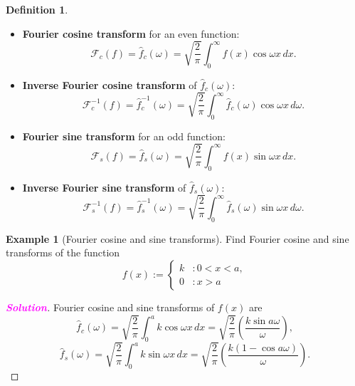 \documentclass[12pt,openany]{book}
\theoremstyle{definition}
\newtheorem{definition}{Definition}[chapter]
\newtheorem{example}{Example}[chapter]
\newcommand{\sol}{\textcolor{magenta}{\bf Solution}}
\begin{document}
	\begin{tcolorbox}[colframe=defcolor, title={\color{white}\bf Definition (Fourier Cosine and Sine Transforms)}]
		\begin{definition}
			\ \begin{itemize}
				\item \textbf{Fourier cosine transform} for an even function:
				\[
				\mathcal{F}_c(f)=\hat{f}_c(\omega)=\sqrt{\frac{2}{\pi}} \int_{0}^{\infty} f(x) \cos \omega x \, dx.
				\]
				\item \textbf{Inverse Fourier cosine transform} of \( \hat{f}_c(\omega) \):
				\[
				\mathcal{F}_c^{-1}(f)=\hat{f}_c^{-1}(\omega) = \sqrt{\frac{2}{\pi}} \int_{0}^{\infty} \hat{f}_c(\omega) \cos \omega x \, d\omega.
				\]
				\item \textbf{Fourier sine transform} for an odd function:
				\[
				\mathcal{F}_s(f)=\hat{f}_s(\omega) = \sqrt{\frac{2}{\pi}} \int_{0}^{\infty} f(x) \sin \omega x \, dx.
				\]
				\item \textbf{Inverse Fourier sine transform} of \( \hat{f}_s(\omega) \):
				\[
				\mathcal{F}_s^{-1}(f)=\hat{f}_s^{-1}(\omega) = \sqrt{\frac{2}{\pi}} \int_{0}^{\infty} \hat{f}_s(\omega) \sin \omega x \, d\omega.
				\]
			\end{itemize}
		\end{definition}
	\end{tcolorbox}
	\vspace{12pt}
	\begin{example}[Fourier cosine and sine transforms]
		Find Fourier cosine and sine transforms of the function
		\[
		f(x) :=
		\begin{cases}
			k &: 0 < x < a, \\
			0 &:x > a
		\end{cases}
		\]
		\begin{proof}[\sol]
			Fourier cosine and sine transforms of \( f(x) \) are
			\[
			\hat{f}_c(\omega) = \sqrt{\frac{2}{\pi}} \int_{0}^{a} k \cos \omega x \, dx = \sqrt{\frac{2}{\pi}} \left( \frac{k \sin a\omega}{\omega} \right),
			\]
			\[
			\hat{f}_s(\omega) = \sqrt{\frac{2}{\pi}} \int_{0}^{a} k \sin \omega x \, dx = \sqrt{\frac{2}{\pi}} \left( \frac{k(1 - \cos a\omega)}{\omega} \right).
			\]
		\end{proof}
	\end{example}
	
\end{document}
